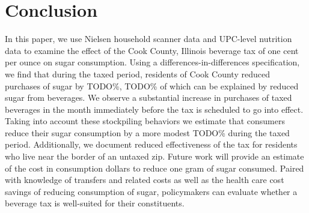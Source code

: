 \documentclass[12pt]{article}
\begin{document}

\section{Conclusion} \label{conclusion}

In this paper, we use Nielsen household scanner data and UPC-level nutrition data to examine the effect of the Cook County, Illinois beverage tax of one cent per ounce on sugar consumption. Using a differences-in-differences specification, we find that during the taxed period, residents of Cook County reduced purchases of sugar by TODO\%, TODO\% of which can be explained by reduced sugar from beverages. We observe a substantial increase in purchases of taxed beverages in the month immediately before the tax is scheduled to go into effect. Taking into account these stockpiling behaviors we estimate that consumers reduce their sugar consumption by a more modest TODO\% during the taxed period. Additionally, we document reduced effectiveness of the tax for residents who live near the border of an untaxed zip. Future work will provide an estimate of the cost in consumption dollars to reduce one gram of sugar consumed. Paired with knowledge of transfers and related costs as well as the health care cost savings of reducing consumption of sugar, policymakers can evaluate whether a beverage tax is well-suited for their constituents.





\clearpage
\printbibliography


\singlespacing
\clearpage


\clearpage
% 
\label{didsugartable}
\end{document}
